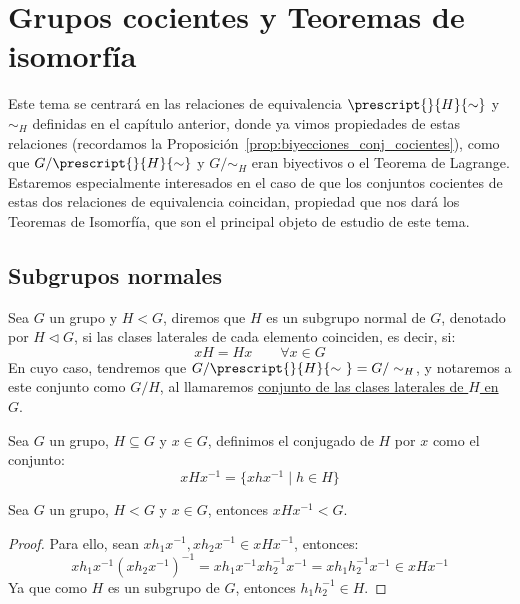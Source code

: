 \chapter{Grupos cocientes y Teoremas de isomorfía}
Este tema se centrará en las relaciones de equivalencia $\prescript{}{H}{\sim}$ y $\sim_H$ definidas en el capítulo anterior, donde ya vimos propiedades de estas relaciones (recordamos la Proposición~\ref{prop:biyecciones_conj_cocientes}), como que $G/\prescript{}{H}{\sim}$ y $G/\sim_H$ eran biyectivos o el Teorema de Lagrange. Estaremos especialmente interesados en el caso de que los conjuntos cocientes de estas dos relaciones de equivalencia coincidan, propiedad que nos dará los Teoremas de Isomorfía, que son el principal objeto de estudio de este tema.

\section{Subgrupos normales}
\begin{definicion}
    Sea $G$ un grupo y $H<G$, diremos que $H$ es un subgrupo normal de $G$, denotado por $H \lhd G$, si las clases laterales de cada elemento coinciden, es decir, si:
    \begin{equation*}
        xH = Hx \qquad \forall x\in G
    \end{equation*}
    En cuyo caso, tendremos que $G/\prescript{}{H}{\sim\ } = G/\sim_H$, y notaremos a este conjunto como $G/H$, al llamaremos \underline{conjunto de las clases laterales de $H$ en $G$}. 
\end{definicion}

\begin{definicion}[Conjugado]
    Sea $G$ un grupo, $H\subseteq G$ y $x\in G$, definimos el conjugado de $H$ por $x$ como el conjunto:
    \begin{equation*}
        xHx^{-1} = \{xhx^{-1} \mid h\in H\}
    \end{equation*}
\end{definicion}

\begin{prop}\label{prop:xHx_subgrupo}
    Sea $G$ un grupo, $H<G$ y $x\in G$, entonces $xHx^{-1}< G$.
    \begin{proof}
        Para ello, sean $xh_1x^{-1}, xh_2x^{-1}\in xHx^{-1}$, entonces:
        \begin{equation*}
            xh_1x^{-1}{(xh_2x^{-1})}^{-1} = xh_1x^{-1}xh_2^{-1}x^{-1} = xh_1h_2^{-1}x^{-1} \in xHx^{-1}
        \end{equation*}
        Ya que como $H$ es un subgrupo de $G$, entonces $h_1h_2^{-1}\in H$.
    \end{proof}
\end{prop}~\\

